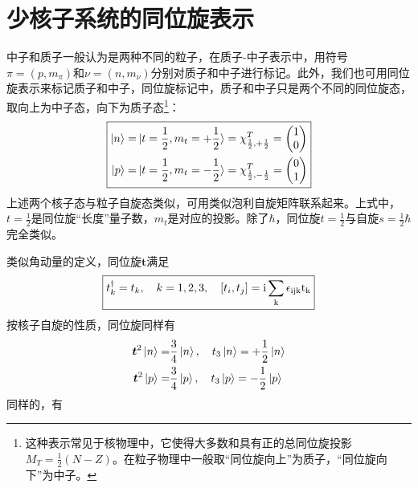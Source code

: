 \section{少核子系统的同位旋表示}
中子和质子一般认为是两种不同的粒子，在质子-中子表示中，用符号$\pi = (p, m_\pi)$和$\nu = (n, m_\nu)$分别对质子和中子进行标记。此外，我们也可用同位旋表示来标记质子和中子，同位旋标记中，质子和中子只是两个不同的同位旋态，取向上为中子态，向下为质子态\footnote{这种表示常见于核物理中，它使得大多数和具有正的总同位旋投影$M_{T} = \frac{1}{2}(N - Z)$。在粒子物理中一般取“同位旋向上”为质子，“同位旋向下”为中子。}：
\begin{equation}
    \boxed{
        \begin{aligned}
            \ket{n} =& \ket{t = \frac{1}{2}, m_{t} = +\frac{1}{2}} = \chi_{\frac{1}{2}, +\frac{1}{2}}^{T} = \begin{pmatrix}
                1 \\
                0
            \end{pmatrix} \\
            \ket{p} =& \ket{t = \frac{1}{2}, m_{t} = -\frac{1}{2}} = \chi_{\frac{1}{2}, -\frac{1}{2}}^{T} = \begin{pmatrix}
                0 \\
                1
            \end{pmatrix}
        \end{aligned}
    }
\end{equation}
上述两个核子态与粒子自旋态类似，可用类似泡利自旋矩阵联系起来。上式中，$t = \frac{1}{2}$是同位旋“长度”量子数，$m_{t}$是对应的投影。除了$\hbar$，同位旋$t = \frac{1}{2}$与自旋$s = \frac{1}{2}\hbar$完全类似。

类似角动量的定义，同位旋$\bm{t}$满足
\begin{equation}
    \boxed{
        t^{\dagger}_{k} = t_k, \quad k = 1, 2, 3,\quad \left[t_i, t_j\right] = \rm{i} \sum_{k}\epsilon_{ijk}t_{k}
    }
\end{equation}
按核子自旋的性质，同位旋同样有
\begin{align}
    \bm{t}^2 \ket{n} =& \frac{3}{4} \ket{n}, \quad t_3\ket{n} = +\frac{1}{2} \ket{n} \\
    \bm{t}^2 \ket{p} =& \frac{3}{4} \ket{p}, \quad t_3\ket{p} = -\frac{1}{2} \ket{p}
\end{align}
同样的，有


